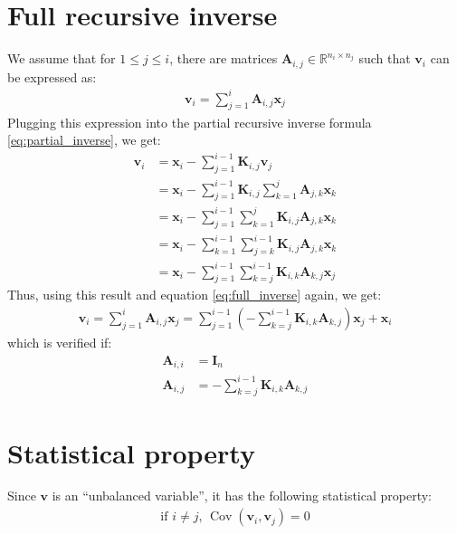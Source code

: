 \documentclass[12pt]{scrartcl}
\DeclareMathOperator{\Cov}{Cov}
\begin{document}
\section{Full recursive inverse}
We assume that for $1 \le j \le i$, there are matrices $\mathbf{A}_{i, j} \in \mathbb{R}^{n_i \times n_j}$ such that $\mathbf{v}_i$ can be expressed as:
\begin{align}
\label{eq:full_inverse}
\mathbf{v}_i = \sum_{j=1}^i \mathbf{A}_{i,j} \mathbf{x}_j
\end{align}
Plugging this expression into the partial recursive inverse formula \eqref{eq:partial_inverse}, we get:
\begin{align}
\mathbf{v}_i & = \mathbf{x}_i - \sum_{j=1}^{i-1} \mathbf{K}_{i,j} \mathbf{v}_j \nonumber \\
& = \mathbf{x}_i - \sum_{j=1}^{i-1} \mathbf{K}_{i,j} \sum_{k=1}^j \mathbf{A}_{j,k} \mathbf{x}_k \nonumber \\
& = \mathbf{x}_i - \sum_{j=1}^{i-1} \sum_{k=1}^j \mathbf{K}_{i,j} \mathbf{A}_{j,k} \mathbf{x}_k \nonumber \\
& = \mathbf{x}_i - \sum_{k=1}^{i-1} \sum_{j=k}^{i-1} \mathbf{K}_{i,j} \mathbf{A}_{j,k} \mathbf{x}_k \nonumber \\
& = \mathbf{x}_i - \sum_{j=1}^{i-1} \sum_{k=j}^{i-1} \mathbf{K}_{i,k} \mathbf{A}_{k,j} \mathbf{x}_j
\end{align}
Thus, using this result and equation \eqref{eq:full_inverse} again, we get:
\begin{align}
\mathbf{v}_i = \sum_{j=1}^i \mathbf{A}_{i,j} \mathbf{x}_j = \sum_{j=1}^{i-1} \left(-\sum_{k=j}^{i-1} \mathbf{K}_{i,k} \mathbf{A}_{k,j}\right) \mathbf{x}_j + \mathbf{x}_i
\end{align}
which is verified if:
\begin{subequations}
\begin{align}
\mathbf{A}_{i,i} & = \mathbf{I}_n \\
\mathbf{A}_{i,j} & = - \sum_{k=j}^{i-1} \mathbf{K}_{i,k} \mathbf{A}_{k,j}
\end{align}
\end{subequations}

\section{Statistical property}
Since $\mathbf{v}$ is an ``unbalanced variable'', it has the following statistical property:
\begin{align}
\label{eq:stat_prop}
\text{if } i \ne j \text{, }\Cov\left(\mathbf{v}_i,\mathbf{v}_j\right) = 0
\end{align}
\end{document}
